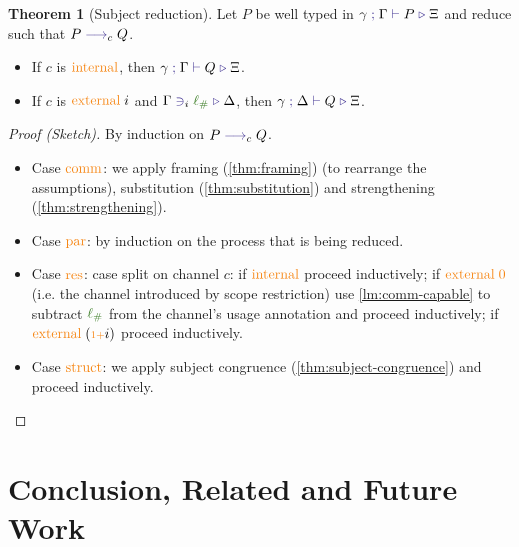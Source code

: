 \documentclass[a4paper,UKenglish,cleveref,autoref,thm-restate,authorcolumns]{lipics-v2019}
\theoremstyle{definition}
\newtheorem{nitheorem}{Theorem}
\newcommand{\type}[1]{\textcolor{BlueViolet}{\operatorname{#1}}}
\newcommand{\constr}[1]{\textcolor{BurntOrange}{\operatorname{#1}}}
\newcommand{\func}[1]{\textcolor{OliveGreen}{\operatorname{#1}}}
\newcommand{\suc}{\constr{\scriptstyle 1+}}
\newcommand{\lio}{\func{\ell_{\#}}}
\newcommand{\reduce}[1]{\; \type{\longrightarrow}_{#1} \;}
\newcommand{\types}[4]{#1 \; \type{;} \; #2 \; \type{\vdash} \; #3 \; \type{\triangleright} \; #4}
\newcommand{\containsusage}[4]{#1 \; \type{\ni}_{#2} \; #3 \; \type{\triangleright} \; #4}
\begin{document}
\begin{nitheorem}[Subject reduction]
  \label{thm:subject-reduction}
  Let $P$ be well typed in $\types{\gamma}{\Gamma}{P}{\Xi}$ and reduce such that $P \reduce{c} Q$.
  \begin{itemize}
    \item If $c$ is $\constr{internal}$, then $\types{\gamma}{\Gamma}{Q}{\Xi}$.
    \item If $c$ is $\constr{external} \; i$ and $\containsusage{\Gamma}{i}{\lio}{\Delta}$, then $\types{\gamma}{\Delta}{Q}{\Xi}$.
  \end{itemize}
\end{nitheorem}

\begin{proof}[Proof (Sketch)]
  By induction on $P \reduce{c} Q$.
  \hfill{}\\
  \begin{itemize}
    \item
    Case $\constr{comm}$: we apply framing (\autoref{thm:framing}) (to rearrange the assumptions), substitution (\autoref{thm:substitution}) and strengthening (\autoref{thm:strengthening}).
  
    \item
    Case $\constr{par}$: by induction on the process that is being reduced.

    \item
    Case $\constr{res}$: case split on channel $c$:
    if $\constr{internal}$ proceed inductively;
    if $\constr{external}\; \constr{0}$ (i.e. the channel introduced by scope restriction) use \autoref{lm:comm-capable} to subtract $\lio$ from the channel's usage annotation and proceed inductively;
    if $\constr{external}\; (\suc i)$ proceed inductively.

    \item
    Case $\constr{struct}$: we apply subject congruence (\autoref{thm:subject-congruence}) and proceed inductively. \qedhere
  \end{itemize}
\end{proof}

\section{Conclusion, Related and Future Work}
\end{document}
